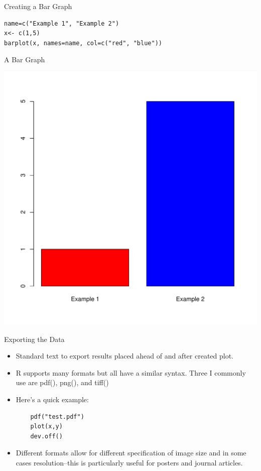 \documentclass{beamer}
\begin{document}
    \begin{frame}[fragile]{Creating a Bar Graph}
    \begin{verbatim}
name=c("Example 1", "Example 2")
x<- c(1,5)
barplot(x, names=name, col=c("red", "blue"))
\end{verbatim}
\end{frame}
\begin{frame}[fragile]{A Bar Graph}
\begin{center}
\includegraphics[width=.8\linewidth]{bargraph.pdf}
\end{center}
\end{frame}
\begin{frame}[fragile]{Exporting the Data}
\begin{itemize}
    \item Standard text to export results placed ahead of and after created plot.
    \item R supports many formats but all have a similar syntax. Three I commonly use are pdf(), png(), and tiff()
    \item Here's a quick example:
\begin{verbatim}
    pdf("test.pdf")
    plot(x,y)
    dev.off()
\end{verbatim}
\item Different formats allow for different specification of image size and in some cases resolution--this is particularly useful for posters and journal articles.
\end{itemize}
\end{frame}
\end{document}
